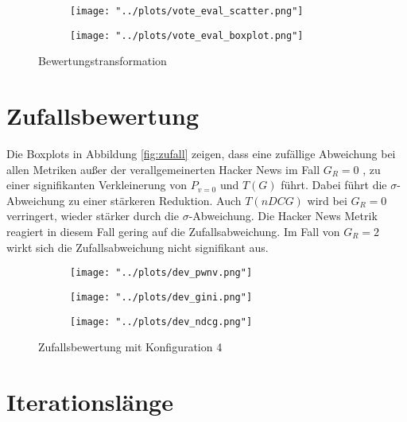 \begin{figure}[!h]
	\label{fig:trans}	
	\begin{subfigure}{0.5\textwidth}
		\texttt{[image: "../plots/vote\_eval\_scatter.png"]}
	\end{subfigure}
	\begin{subfigure}{0.5\textwidth}
		\texttt{[image: "../plots/vote\_eval\_boxplot.png"]}
	\end{subfigure}
	\caption{Bewertungstransformation}
\end{figure}


\section{Zufallsbewertung}


Die Boxplots in Abbildung \ref{fig:zufall} zeigen, dass eine zufällige Abweichung bei allen Metriken außer der verallgemeinerten Hacker News im Fall $G_R = 0$ , zu einer signifikanten Verkleinerung von $P_{v=0}$ und $T(G)$ führt. Dabei führt die $\sigma$-Abweichung zu einer stärkeren Reduktion. Auch $T(nDCG)$ wird bei $G_R = 0$ verringert, wieder stärker durch die $\sigma$-Abweichung. Die Hacker News Metrik reagiert in diesem Fall gering auf die Zufallsabweichung. Im Fall von $G_R = 2$ wirkt sich die Zufallsabweichung nicht signifikant aus.

\begin{figure}[!h]
	\label{fig:zufall}	
	\begin{subfigure}{0.5\textwidth}
		\texttt{[image: "../plots/dev\_pwnv.png"]}
	\end{subfigure}
	\begin{subfigure}{0.5\textwidth}
		\texttt{[image: "../plots/dev\_gini.png"]}
	\end{subfigure}
	\begin{subfigure}{0.5\textwidth}
		\texttt{[image: "../plots/dev\_ndcg.png"]}
	\end{subfigure}
	\caption{Zufallsbewertung mit Konfiguration 4}
\end{figure}


\section{Iterationslänge}

